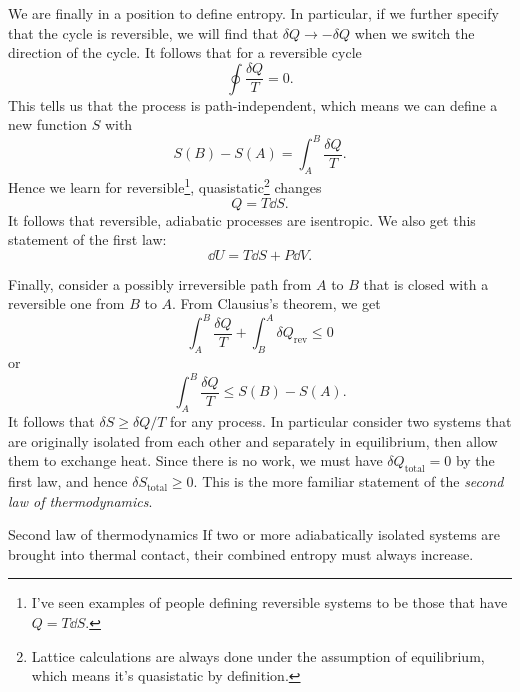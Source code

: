 We are finally in a position to define entropy.
In particular, if we further specify that the cycle is reversible,
we will find that $\delta Q\to-\delta Q$ when we switch the direction of the
cycle. It follows that for a reversible cycle
\begin{equation}
 \oint\frac{\delta Q}{T}=0. 
\end{equation}
This tells us that the process is path-independent, which means we can define a
new function $S$ with
\begin{equation}
 S(B)-S(A)=\int_A^B\frac{\delta Q}{T}. 
\end{equation}
Hence we learn for reversible\footnote{I've seen examples of people defining
reversible systems to be those that have $Q=T\dd{S}$.}, 
quasistatic\footnote{Lattice calculations are always done under the assumption
of equilibrium, which means it's quasistatic by definition.} changes
\begin{equation}
Q=T\dd{S}.
\end{equation}
It follows that reversible, adiabatic processes are isentropic.
We also get this statement of the first law:
\begin{equation}
 \dd U = T\dd{S}+P\dd{V}.
\end{equation} 

Finally, consider a possibly irreversible path from $A$ to $B$ that is closed
with a reversible one from $B$ to $A$. From Clausius's theorem, we get
\begin{equation}
\int_A^B\frac{\delta Q}{T}+\int_B^A\delta Q_{\text{rev}}\leq0
\end{equation}
or
\begin{equation}
\int_A^B\frac{\delta Q}{T}\leq S(B)-S(A).
\end{equation}
It follows that $\delta S\geq\delta Q/T$ for any process. In particular consider
two systems that are originally isolated from each other and separately in
equilibrium, then allow them to exchange heat. Since there is no work, we must
have $\delta Q_{\text{total}}=0$ by the first law, and hence $\delta
S_{\text{total}}\geq0$. This is the more familiar statement of
the {\it second law of thermodynamics}.
\begin{theorem}{Second law of thermodynamics}{}
If two or more adiabatically isolated systems are brought into thermal contact,
their combined entropy must always increase.
\end{theorem}


